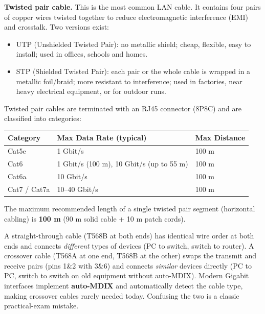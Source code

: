 \documentclass[11pt]{article}
\newcommand{\cle}[1]{{\popxbold\color{popdark}#1}}
\begin{document}
\textbf{Twisted pair cable.} This is the most common LAN cable. It contains four pairs of copper wires twisted together to reduce electromagnetic interference (EMI) and crosstalk. Two versions exist:
\begin{itemize}
\item \cle{UTP} (Unshielded Twisted Pair): no metallic shield; cheap, flexible, easy to install; used in offices, schools and homes.
\item \cle{STP} (Shielded Twisted Pair): each pair or the whole cable is wrapped in a metallic foil/braid; more resistant to interference; used in factories, near heavy electrical equipment, or for outdoor runs.
\end{itemize}
Twisted pair cables are terminated with an \cle{RJ45 connector} (8P8C) and are classified into \cle{categories}:
\begin{center}
\begin{tabularx}{\linewidth}{|l|X|X|}\hline
\rowcolor{popblueL}
\textbf{Category} & \textbf{Max Data Rate (typical)} & \textbf{Max Distance} \\ \hline
Cat5e & 1 Gbit/s & 100 m \\ \hline
Cat6 & 1 Gbit/s (100 m), 10 Gbit/s (up to 55 m) & 100 m \\ \hline
Cat6a & 10 Gbit/s & 100 m \\ \hline
Cat7 / Cat7a & 10--40 Gbit/s & 100 m \\ \hline
\end{tabularx}
\end{center}
The maximum recommended length of a single twisted pair segment (horizontal cabling) is \textbf{100 m} (90 m solid cable + 10 m patch cords).

\begin{attention}
A \cle{straight-through cable} (T568B at both ends) has identical wire order at both ends and connects \emph{different} types of devices (PC to switch, switch to router). A \cle{crossover cable} (T568A at one end, T568B at the other) swaps the transmit and receive pairs (pins 1\&2 with 3\&6) and connects \emph{similar} devices directly (PC to PC, switch to switch on old equipment without auto-MDIX). Modern Gigabit interfaces implement \textbf{auto-MDIX} and automatically detect the cable type, making crossover cables rarely needed today. Confusing the two is a classic practical-exam mistake.
\end{attention}
\end{document}
